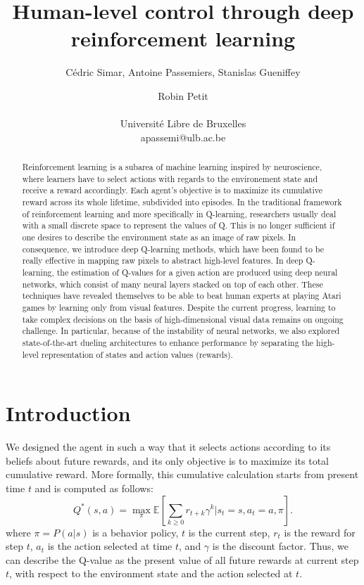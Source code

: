 \documentclass[letterpaper]{article}
\title{Human-level control through deep reinforcement learning}
\author{C\'{e}dric Simar, Antoine Passemiers, Stanislas Gueniffey \and Robin Petit \\
\mbox{}\\
Universit\'{e} Libre de Bruxelles \\
apassemi@ulb.ac.be}
\newcommand{\E}{\mathbb E}
\begin{document}
\maketitle

\begin{abstract}

  Reinforcement learning is a subarea of machine learning inspired by neuroscience, where learners have to select actions with
  regards to the environement state and receive a reward accordingly. Each agent's objective is to maximize its cumulative reward across its whole lifetime,
  subdivided into episodes. In the traditional framework of reinforcement learning and more specifically in Q-learning,
  researchers usually deal with a small discrete space to represent the values of Q. This is no longer sufficient if one desires to describe the environment state
  as an image of raw pixels. In consequence, we introduce deep Q-learning methods, which have been found to be really effective in mapping raw pixels
  to abstract high-level features. In deep Q-learning, the estimation of Q-values for a given action are produced using deep neural networks,
  which consist of many neural layers stacked on top of each other.
  These techniques have revealed themselves to be able to beat human experts at playing Atari games
  by learning only from visual features. Despite the current progress, learning to take complex decisions on the basis of high-dimensional visual data remains on
  ongoing challenge. In particular, because of the instability of neural networks, we also explored state-of-the-art dueling architectures to enhance performance
  by separating the high-level representation of states and action values (rewards).

\end{abstract}

\section{Introduction}

We designed the agent in such a way that it selects actions according to its beliefs about future rewards, and its only objective is to maximize its total
cumulative reward. More formally, this cumulative calculation starts from present time $t$ and is computed as follows:
\[
  Q^{*}(s, a) = \max_{\pi} \E\left[ \sum_{k \geq 0}r_{t+k}\gamma^k | s_t = s, a_t = a, \pi\right].
\]
where $\pi = P(a | s)$ is a behavior policy, $t$ is the current step, $r_t$ is the reward for step $t$, $a_t$ is the action selected at time $t$,
and $\gamma$ is the discount factor. Thus, we can describe the Q-value as the present value of all future rewards at current step $t$,
with respect to the environment state and the action selected at $t$.
\end{document}

